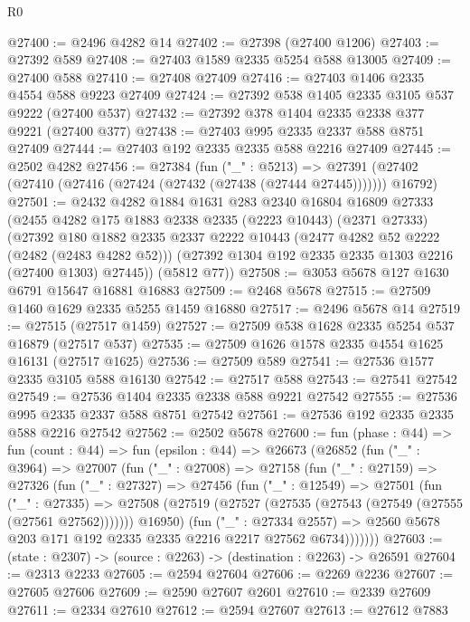 \begin{lexlean}{R0}
\begin{coremodule}
@27400 := @2496 @4282 @14
@27402 := @27398 (@27400 @1206)
@27403 := @27392 @589
@27408 := @27403 @1589 @2335 @5254 @588 @13005
@27409 := @27400 @588
@27410 := @27408 @27409
@27416 := @27403 @1406 @2335 @4554 @588 @9223 @27409
@27424 := @27392 @538 @1405 @2335 @3105 @537 @9222 (@27400 @537)
@27432 := @27392 @378 @1404 @2335 @2338 @377 @9221 (@27400 @377)
@27438 := @27403 @995 @2335 @2337 @588 @8751 @27409
@27444 := @27403 @192 @2335 @2335 @588 @2216 @27409
@27445 := @2502 @4282
@27456 := @27384
    (fun ("_" : @5213) =>
    @27391 (@27402 (@27410 (@27416 (@27424 (@27432 (@27438 (@27444 @27445))))))) @16792)
@27501 := @2432
    @4282
    @1884
    @1631
    @283
    @2340
    @16804
    @16809
    @27333
    (@2455
      @4282
      @175
      @1883
      @2338
      @2335
      (@2223 @10443)
      (@2371 @27333)
      (@27392
        @180
        @1882
        @2335
        @2337
        @2222
        @10443
        (@2477 @4282 @52 @2222 (@2482 (@2483 @4282 @52)))
        (@27392 @1304 @192 @2335 @2335 @1303 @2216 (@27400 @1303) @27445))
      (@5812 @77))
@27508 := @3053 @5678 @127 @1630 @6791 @15647 @16881 @16883
@27509 := @2468 @5678
@27515 := @27509 @1460 @1629 @2335 @5255 @1459 @16880
@27517 := @2496 @5678 @14
@27519 := @27515 (@27517 @1459)
@27527 := @27509 @538 @1628 @2335 @5254 @537 @16879 (@27517 @537)
@27535 := @27509 @1626 @1578 @2335 @4554 @1625 @16131 (@27517 @1625)
@27536 := @27509 @589
@27541 := @27536 @1577 @2335 @3105 @588 @16130
@27542 := @27517 @588
@27543 := @27541 @27542
@27549 := @27536 @1404 @2335 @2338 @588 @9221 @27542
@27555 := @27536 @995 @2335 @2337 @588 @8751 @27542
@27561 := @27536 @192 @2335 @2335 @588 @2216 @27542
@27562 := @2502 @5678
@27600 := fun (phase : @44) =>
  fun (count : @44) =>
  fun (epsilon : @44) =>
  @26673
    (@26852
      (fun ("_" : @3964) =>
      @27007
        (fun ("_" : @27008) =>
        @27158
          (fun ("_" : @27159) =>
          @27326
            (fun ("_" : @27327) =>
            @27456
              (fun ("_" : @12549) =>
              @27501
                (fun ("_" : @27335) =>
                @27508 (@27519 (@27527 (@27535 (@27543 (@27549 (@27555 (@27561 @27562))))))) @16950)
                (fun ("_" : @27334 @2557) =>
                @2560 @5678 @203 @171 @192 @2335 @2335 @2216 @2217 @27562 @6734)))))))
@27603 := (state : @2307) -> (source : @2263) -> (destination : @2263) -> @26591
@27604 := @2313 @2233
@27605 := @2594 @27604
@27606 := @2269 @2236
@27607 := @27605 @27606
@27609 := @2590 @27607 @2601
@27610 := @2339 @27609
@27611 := @2334 @27610
@27612 := @2594 @27607
@27613 := @27612 @7883

\end{coremodule}
\end{lexlean}
